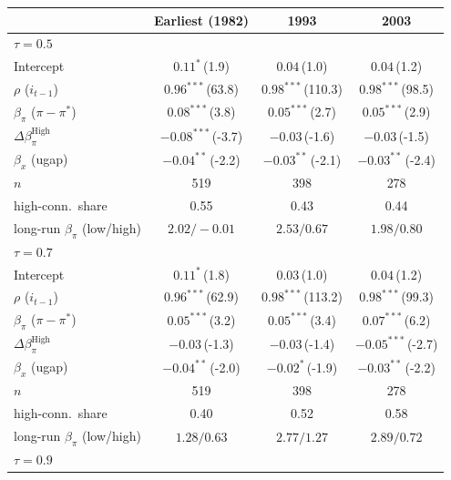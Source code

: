 \setlength{\tabcolsep}{4pt}\scriptsize
\begin{tabular}{lccc}
\toprule
 & Earliest (1982) & 1993 & 2003 \\
\midrule
\multicolumn{4}{l}{\textit{$\tau=0.5$}} \\
Intercept & $0.11^{*}$\,{\scriptsize(1.9)} & $0.04$\,{\scriptsize(1.0)} & $0.04$\,{\scriptsize(1.2)} \\
$\rho$ ($i_{t-1}$) & $0.96^{***}$\,{\scriptsize(63.8)} & $0.98^{***}$\,{\scriptsize(110.3)} & $0.98^{***}$\,{\scriptsize(98.5)} \\
$\beta_\pi$ ($\pi-\pi^*$) & $0.08^{***}$\,{\scriptsize(3.8)} & $0.05^{***}$\,{\scriptsize(2.7)} & $0.05^{***}$\,{\scriptsize(2.9)} \\
$\Delta\beta_\pi^{\text{High}}$ & $-0.08^{***}$\,{\scriptsize(-3.7)} & $-0.03$\,{\scriptsize(-1.6)} & $-0.03$\,{\scriptsize(-1.5)} \\
$\beta_x$ (ugap) & $-0.04^{**}$\,{\scriptsize(-2.2)} & $-0.03^{**}$\,{\scriptsize(-2.1)} & $-0.03^{**}$\,{\scriptsize(-2.4)} \\
\addlinespace
$n$ & 519 & 398 & 278 \\
high-conn.\ share & 0.55 & 0.43 & 0.44 \\
long-run $\beta_\pi$ (low/high) & $2.02/-0.01$ & $2.53/0.67$ & $1.98/0.80$ \\
\midrule
\multicolumn{4}{l}{\textit{$\tau=0.7$}} \\
Intercept & $0.11^{*}$\,{\scriptsize(1.8)} & $0.03$\,{\scriptsize(1.0)} & $0.04$\,{\scriptsize(1.2)} \\
$\rho$ ($i_{t-1}$) & $0.96^{***}$\,{\scriptsize(62.9)} & $0.98^{***}$\,{\scriptsize(113.2)} & $0.98^{***}$\,{\scriptsize(99.3)} \\
$\beta_\pi$ ($\pi-\pi^*$) & $0.05^{***}$\,{\scriptsize(3.2)} & $0.05^{***}$\,{\scriptsize(3.4)} & $0.07^{***}$\,{\scriptsize(6.2)} \\
$\Delta\beta_\pi^{\text{High}}$ & $-0.03$\,{\scriptsize(-1.3)} & $-0.03$\,{\scriptsize(-1.4)} & $-0.05^{***}$\,{\scriptsize(-2.7)} \\
$\beta_x$ (ugap) & $-0.04^{**}$\,{\scriptsize(-2.0)} & $-0.02^{*}$\,{\scriptsize(-1.9)} & $-0.03^{**}$\,{\scriptsize(-2.2)} \\
\addlinespace
$n$ & 519 & 398 & 278 \\
high-conn.\ share & 0.40 & 0.52 & 0.58 \\
long-run $\beta_\pi$ (low/high) & $1.28/0.63$ & $2.77/1.27$ & $2.89/0.72$ \\
\midrule
\multicolumn{4}{l}{\textit{$\tau=0.9$}} \\

\end{tabular}
